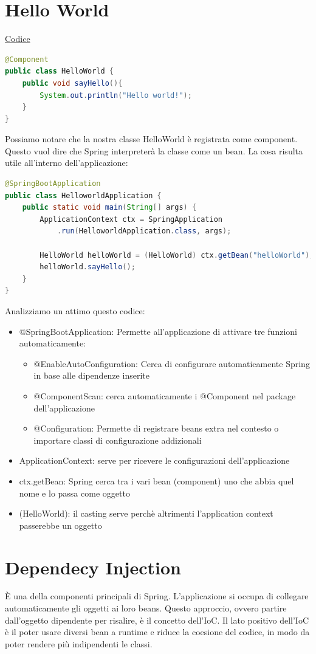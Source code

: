 \documentclass[11pt,a4paper]{book}
\begin{document}
\section{Hello World}
\href{Codici/HelloWorld2}{Codice}

\begin{lstlisting}[language = Java]
@Component
public class HelloWorld {
    public void sayHello(){
        System.out.println("Hello world!");
    }
}
\end{lstlisting}
Possiamo notare che la nostra classe HelloWorld è registrata come component. Questo vuol dire che Spring interpreterà la classe come un bean. La cosa risulta utile all'interno dell'applicazione:

\begin{lstlisting}[language = Java]
@SpringBootApplication
public class HelloworldApplication {
    public static void main(String[] args) {
        ApplicationContext ctx = SpringApplication
        	.run(HelloworldApplication.class, args);

        HelloWorld helloWorld = (HelloWorld) ctx.getBean("helloWorld");
        helloWorld.sayHello();  
    }
}
\end{lstlisting}
Analizziamo un attimo questo codice:
\begin{itemize}
	\item @SpringBootApplication: Permette all'applicazione di attivare tre funzioni automaticamente:
	\begin{itemize}
		\item @EnableAutoConfiguration: Cerca di configurare automaticamente Spring in base alle dipendenze inserite
		\item @ComponentScan: cerca automaticamente i @Component nel package dell'applicazione
		\item @Configuration: Permette di registrare beans extra nel contesto o importare classi di configurazione addizionali
	\end{itemize}
	\item ApplicationContext: serve per ricevere le configurazioni dell'applicazione
	\item ctx.getBean: Spring cerca tra i vari bean (component) uno che abbia quel nome e lo passa come oggetto
	\item (HelloWorld): il casting serve perchè altrimenti l'application context passerebbe un oggetto
\end{itemize}

\section{Dependecy Injection}
È una della componenti principali di Spring. L'applicazione si occupa di collegare automaticamente gli oggetti ai loro beans. Questo approccio, ovvero partire dall'oggetto dipendente per risalire, è il concetto dell'IoC. Il lato positivo dell'IoC è il poter usare diversi bean a runtime e riduce la coesione del codice, in modo da poter rendere più indipendenti le classi.
\end{document}
